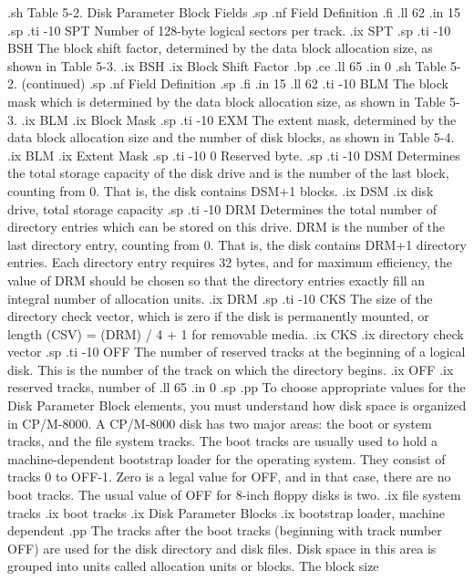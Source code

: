 .sh
Table 5-2.  Disk Parameter Block Fields
.sp
.nf
    Field                      Definition
.fi
.ll 62
.in 15
.sp
.ti -10
SPT       Number of 128-byte logical sectors per track.
.ix SPT
.sp
.ti -10
BSH       The block shift factor, determined by the data block allocation 
size, as shown in Table 5-3.
.ix BSH
.ix Block Shift Factor
.bp
.ce
.ll 65
.in 0
.sh
Table 5-2.  (continued)
.sp
.nf
    Field                      Definition
.sp
.fi
.in 15
.ll 62
.ti -10
BLM       The block mask which is determined by the data block allocation 
size, as shown in Table 5-3.
.ix BLM
.ix Block Mask
.sp
.ti -10
EXM       The extent mask, determined by the data block allocation
size and the number of disk blocks, as shown in Table 5-4.
.ix BLM
.ix Extent Mask
.sp
.ti -10
0         Reserved byte.
.sp
.ti -10
DSM       Determines the total storage capacity of the disk drive and
is the number of the last block, counting from 0.  That is,
the disk contains DSM+1 blocks.
.ix DSM
.ix disk drive, total storage capacity
.sp
.ti -10
DRM       Determines the total number of directory entries which can be
stored on this drive.  DRM is the number of the last directory entry,
counting from 0.  That is, the disk contains DRM+1 directory entries.
Each directory entry requires 32 bytes, and for maximum efficiency, the
value of DRM should be chosen so that the directory entries exactly fill
an integral number of allocation units.
.ix DRM
.sp
.ti -10
CKS       The size of the directory check vector, which is zero if the disk
is permanently mounted, or length (CSV) = (DRM) / 4 + 1 for removable
media.
.ix CKS
.ix directory check vector
.sp
.ti -10
OFF       The number of reserved tracks at the beginning of a logical
disk.  This is the number of the track on which the directory begins.
.ix OFF
.ix reserved tracks, number of
.ll 65
.in 0
.sp 
.pp
To choose appropriate values for the Disk Parameter Block elements, you must 
understand how disk space is organized in CP/M-8000.  A CP/M-8000
disk has two major areas:  the boot or system tracks, and the file system
tracks.  The boot tracks are usually used to hold a machine-dependent
bootstrap loader for the operating system.  They consist of tracks 0 to OFF-1.
Zero is a legal value for OFF, and in that case, there are no boot tracks.  The
usual value of OFF for 8-inch floppy disks is two.
.ix file system tracks
.ix boot tracks
.ix Disk Parameter Blocks
.ix bootstrap loader, machine dependent
.pp
The tracks after the boot tracks (beginning with track number OFF) 
are used for the disk directory and disk files.  Disk space in this area
is grouped into units called allocation units or blocks.  The block size
